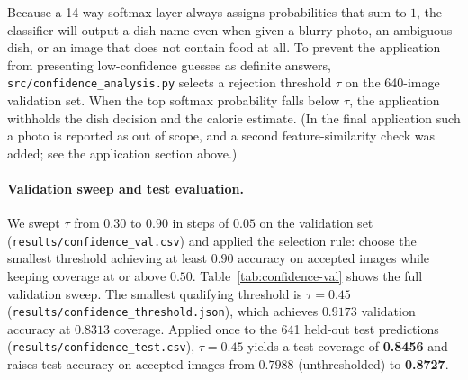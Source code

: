 Because a 14-way softmax layer always assigns probabilities that sum to $1$,
the classifier will output a dish name even when given a blurry photo, an
ambiguous dish, or an image that does not contain food at all. To prevent the
application from presenting low-confidence guesses as definite answers,
\texttt{src/confidence\_analysis.py} selects a rejection threshold $\tau$ on
the 640-image validation set. When the top softmax probability falls below
$\tau$, the application withholds the dish decision and the calorie estimate. (In the
final application such a photo is reported as out of scope, and a second
feature-similarity check was added; see the application section above.)

\paragraph{Validation sweep and test evaluation.}
We swept $\tau$ from $0.30$ to $0.90$ in steps of $0.05$ on the validation set
(\texttt{results/confidence\_val.csv}) and applied the selection rule: choose
the smallest threshold achieving at least $0.90$ accuracy on accepted images
while keeping coverage at or above $0.50$. Table~\ref{tab:confidence-val}
shows the full validation sweep. The smallest qualifying threshold is
$\tau = 0.45$ (\texttt{results/confidence\_threshold.json}), which achieves
$0.9173$ validation accuracy at $0.8313$ coverage. Applied once to the 641
held-out test predictions (\texttt{results/confidence\_test.csv}),
$\tau = 0.45$ yields a test coverage of \textbf{0.8456} and raises test
accuracy on accepted images from $0.7988$ (unthresholded) to \textbf{0.8727}.

